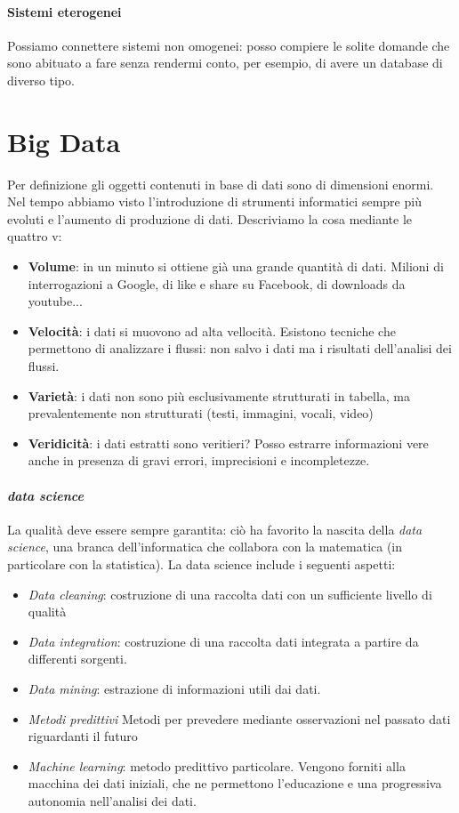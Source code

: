 \paragraph{Sistemi eterogenei} Possiamo connettere sistemi non omogenei: posso compiere le solite domande che sono abituato a fare senza rendermi conto, per esempio, di avere un database di diverso tipo.
\section{Big Data}
Per definizione gli oggetti contenuti in base di dati sono di dimensioni enormi. Nel tempo abbiamo visto l'introduzione di strumenti informatici sempre più evoluti e l'aumento di produzione di dati. Descriviamo la cosa mediante le quattro v:
\begin{itemize}
	\item \textbf{Volume}: in un minuto si ottiene già una grande quantità di dati. Milioni di interrogazioni a Google, di like e share su Facebook, di downloads da youtube... 
	\item \textbf{Velocità}: i dati si muovono ad alta vellocità. Esistono tecniche che permettono di analizzare i flussi: non salvo i dati ma i risultati dell'analisi dei flussi.
	\item \textbf{Varietà}: i dati non sono più esclusivamente strutturati in tabella, ma prevalentemente non strutturati (testi, immagini, vocali, video)
	\item \textbf{Veridicità}: i dati estratti sono veritieri? Posso estrarre informazioni vere anche in presenza di gravi errori, imprecisioni e incompletezze. 
\end{itemize}
\paragraph{\emph{data science}} La qualità deve essere sempre garantita: ciò ha favorito la nascita della \emph{data science}, una branca dell'informatica che collabora con la matematica (in particolare con la statistica). La data science include i seguenti aspetti:
\begin{itemize}
	\item \emph{Data cleaning}: costruzione di una raccolta dati con un sufficiente livello di qualità
	\item \emph{Data integration}: costruzione di una raccolta dati integrata a partire da differenti sorgenti.
	\item \emph{Data mining}: estrazione di informazioni utili dai dati.
	\item \emph{Metodi predittivi} Metodi per prevedere mediante osservazioni nel passato dati riguardanti il futuro
	\item \emph{Machine learning}: metodo predittivo particolare. Vengono forniti alla macchina dei dati iniziali, che ne permettono l'educazione e una progressiva autonomia nell'analisi dei dati.
\end{itemize}
